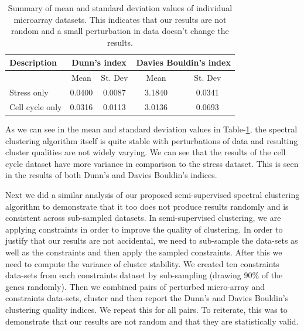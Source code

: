\begin{table}[p]
\centering
\begin{tabular}{|l|c|c|c|c|}
\hline
Description & \multicolumn{2}{|c|}{Dunn's index}  & \multicolumn{2}{|c|}{Davies Bouldin's index}\\
\hline
 & Mean & St. Dev & Mean & St. Dev\\
\hline
Stress only  & 0.0400 & 0.0087 & 3.1840 & 0.0341 \\
Cell cycle only & 0.0316 & 0.0113 & 3.0136 & 0.0693 \\
\hline 
\end{tabular}
\caption[Summary of mean and standard deviation values of individual microarray datasets.]{Summary of mean and standard deviation values of individual microarray datasets. 
This indicates that our results are not random and a small perturbation in data doesn't change the results.}
\label{tab:stress_ccycle_perturb}
\end{table}

As we can see in the mean and standard deviation values in Table-\ref{tab:stress_ccycle_perturb}, the spectral clustering algorithm itself is quite stable with perturbations of 
data and resulting cluster qualities are not widely varying. We can see that the results of the cell cycle dataset have more variance in comparison to the stress dataset. 
This is seen in the results of both Dunn's and Davies Bouldin's indices.

Next we did a similar analysis of our proposed semi-supervised spectral clustering algorithm to demonstrate that it too does not produce results randomly and is consistent across 
sub-sampled datasets. In semi-supervised clustering, we are applying constraints in order to improve the quality 
of clustering. In order to justify that our results are not accidental, we need to sub-sample the data-sets as well as the constraints and then apply the sampled constraints. After this we need to compute the 
variance of cluster stability. We created ten constraints data-sets from each constraints dataset by sub-sampling (drawing 90\% of the genes randomly). Then we combined pairs of 
perturbed micro-array and constraints data-sets, cluster and then report the Dunn's and Davies Bouldin's clustering quality indices. We repeat this for all pairs. 
To reiterate, this was to demonstrate that our results are not random and that they are statistically valid.

